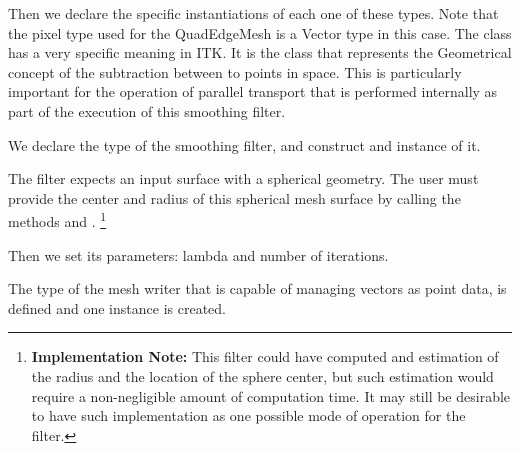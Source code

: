 \documentclass{InsightArticle}
\begin{document}
\begin{center}

\end{center}

Then we declare the specific instantiations of each one of these types. Note
that the pixel type used for the QuadEdgeMesh is a Vector type in this case.
The  class has a very specific meaning in ITK. It is the class
that represents the Geometrical concept of the subtraction between to points in
space. This is particularly important for the operation of parallel transport
that is performed internally as part of the execution of this smoothing filter.

\begin{center}

\end{center}

We declare the type of the smoothing filter, and construct and instance of it. 

\begin{center}

\end{center}

The filter expects an input surface with a spherical geometry. The user must
provide the center and radius of this spherical mesh surface by calling the
methods  and . \footnote{
\textbf{Implementation Note:} This filter could have computed and estimation of
the radius and the location of the sphere center, but such estimation would
require a non-negligible amount of computation time. It may still be desirable
to have such implementation as one possible mode of operation for the filter.}

\begin{center}

\end{center}

Then we set its parameters: lambda and number of iterations.

\begin{center}

\end{center}

The type of the mesh writer that is capable of managing vectors as point data, is 
defined and one instance is created.
\end{document}

